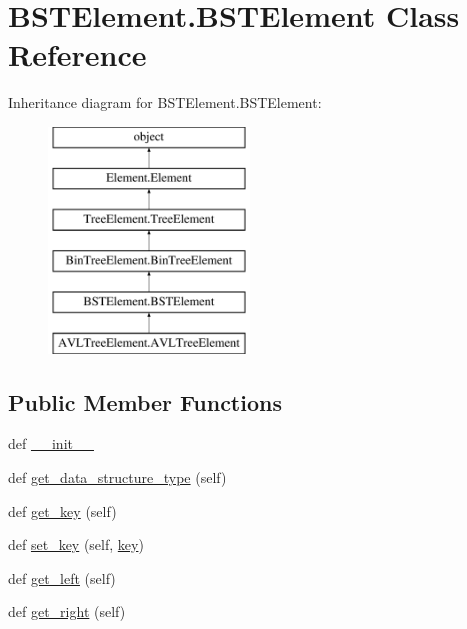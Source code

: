 \hypertarget{class_b_s_t_element_1_1_b_s_t_element}{}\section{B\+S\+T\+Element.\+B\+S\+T\+Element Class Reference}
\label{class_b_s_t_element_1_1_b_s_t_element}
Inheritance diagram for B\+S\+T\+Element.\+B\+S\+T\+Element\+:\begin{figure}[H]
\begin{center}
\leavevmode
\includegraphics[height=6.000000cm]{class_b_s_t_element_1_1_b_s_t_element}
\end{center}
\end{figure}
\subsection*{Public Member Functions}
\begin{DoxyCompactItemize}
\item 
def \hyperlink{class_b_s_t_element_1_1_b_s_t_element_a0a287cbb68ee9a5fbdbba5c808c1fcd6}{\+\_\+\+\_\+init\+\_\+\+\_\+}
\item 
def \hyperlink{class_b_s_t_element_1_1_b_s_t_element_ad372cf1cbc29e996427ab2162a9dbcaf}{get\+\_\+data\+\_\+structure\+\_\+type} (self)
\item 
def \hyperlink{class_b_s_t_element_1_1_b_s_t_element_aa67ecd77bfb90e10dfa634c114056a56}{get\+\_\+key} (self)
\item 
def \hyperlink{class_b_s_t_element_1_1_b_s_t_element_a5db294d56393f73346b4e55816300c14}{set\+\_\+key} (self, \hyperlink{class_b_s_t_element_1_1_b_s_t_element_aa6ae6b6dad6bf59b65a55ec3f94abcfb}{key})
\item 
def \hyperlink{class_b_s_t_element_1_1_b_s_t_element_aa892f1b8dc467de6bba5ebed365c3bd5}{get\+\_\+left} (self)
\item 
def \hyperlink{class_b_s_t_element_1_1_b_s_t_element_a8a67132b355933640bf13efd74741468}{get\+\_\+right} (self)
\end{DoxyCompactItemize}
